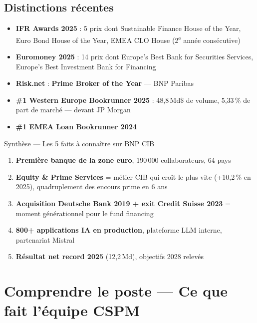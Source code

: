 \documentclass[11pt,a4paper]{article}
\begin{document}
\subsection{Distinctions r\'ecentes}

\begin{itemize}[nosep, leftmargin=12pt]
\item \textbf{IFR Awards 2025} : 5 prix dont Sustainable Finance House of the Year,
      Euro Bond House of the Year, EMEA CLO House (2\textsuperscript{e} ann\'ee cons\'ecutive)
\item \textbf{Euromoney 2025} : 14 prix dont Europe's Best Bank for Securities Services,
      Europe's Best Investment Bank for Financing
\item \textbf{Risk.net} : \textbf{Prime Broker of the Year} --- BNP Paribas
\item \textbf{\#1 Western Europe Bookrunner 2025} : 48,8\,Md\$ de volume, 5,33\,\% de
      part de march\'e --- devant JP Morgan
\item \textbf{\#1 EMEA Loan Bookrunner 2024}
\end{itemize}

\vspace{6pt}

\begin{goodbox}{Synth\`ese --- Les 5 faits \`a conna\^itre sur BNP CIB}
\begin{enumerate}[nosep, leftmargin=16pt]
\item \textbf{Premi\`ere banque de la zone euro}, 190\,000 collaborateurs, 64 pays
\item \textbf{Equity \& Prime Services} = m\'etier CIB qui cro\^it le plus vite (+10,2\,\% en 2025),
      quadruplement des encours prime en 6 ans
\item \textbf{Acquisition Deutsche Bank 2019 + exit Credit Suisse 2023} = moment
      g\'en\'erationnel pour le fund financing
\item \textbf{800+ applications IA en production}, plateforme LLM interne, partenariat Mistral
\item \textbf{R\'esultat net record 2025} (12,2\,Md\texteuro{}), objectifs 2028 relev\'es
\end{enumerate}
\end{goodbox}

\vspace{10pt}

\section{Comprendre le poste --- Ce que fait l'\'equipe CSPM}
\end{document}
